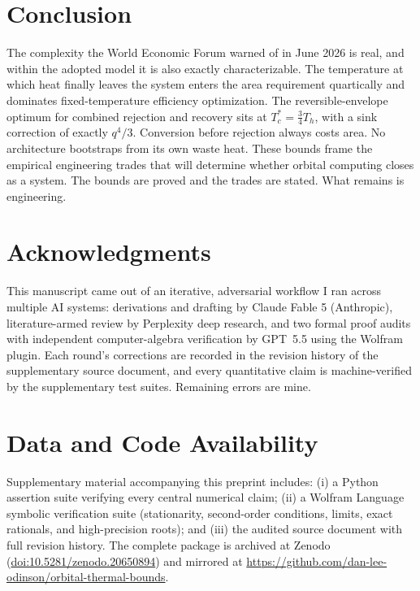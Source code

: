 \documentclass[11pt]{article}
\theoremstyle{definition}
\theoremstyle{remark}
\newcommand{\Th}{T_h}
\newcommand{\Tc}{T_c}
\begin{document}
\section{Conclusion}

The complexity the World Economic Forum warned of in June 2026 is real, and within the adopted model it is also exactly characterizable. The temperature at which heat finally leaves the system enters the area requirement quartically and dominates fixed-temperature efficiency optimization. The reversible-envelope optimum for combined rejection and recovery sits at $\Tc^{*}=\tfrac34\Th$, with a sink correction of exactly $q^{4}/3$. Conversion before rejection always costs area. No architecture bootstraps from its own waste heat. These bounds frame the empirical engineering trades that will determine whether orbital computing closes as a system. The bounds are proved and the trades are stated. What remains is engineering.

\section*{Acknowledgments}

This manuscript came out of an iterative, adversarial workflow I ran across multiple AI systems: derivations and drafting by Claude Fable 5 (Anthropic), literature-armed review by Perplexity deep research, and two formal proof audits with independent computer-algebra verification by GPT~5.5 using the Wolfram plugin. Each round's corrections are recorded in the revision history of the supplementary source document, and every quantitative claim is machine-verified by the supplementary test suites. Remaining errors are mine.

\section*{Data and Code Availability}

Supplementary material accompanying this preprint includes: (i) a Python assertion suite verifying every central numerical claim; (ii) a Wolfram Language symbolic verification suite (stationarity, second-order conditions, limits, exact rationals, and high-precision roots); and (iii) the audited source document with full revision history. The complete package is archived at Zenodo (\href{https://doi.org/10.5281/zenodo.20650894}{doi:10.5281/zenodo.20650894}) and mirrored at \url{https://github.com/dan-lee-odinson/orbital-thermal-bounds}.
\end{document}
